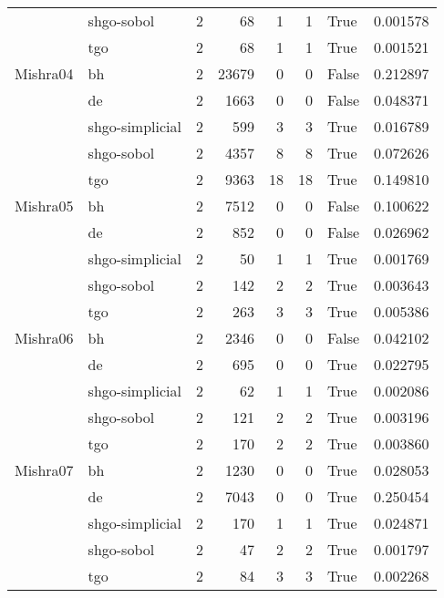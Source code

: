 \begin{longtable}{llrrrrlr}
         & shgo-sobol &     2 &       68 &      1 &       1 &    True &    0.001578 \\
         & tgo &     2 &       68 &      1 &       1 &    True &    0.001521 \\
Mishra04 & bh &     2 &    23679 &      0 &       0 &   False &    0.212897 \\
         & de &     2 &     1663 &      0 &       0 &   False &    0.048371 \\
         & shgo-simplicial &     2 &      599 &      3 &       3 &    True &    0.016789 \\
         & shgo-sobol &     2 &     4357 &      8 &       8 &    True &    0.072626 \\
         & tgo &     2 &     9363 &     18 &      18 &    True &    0.149810 \\
Mishra05 & bh &     2 &     7512 &      0 &       0 &   False &    0.100622 \\
         & de &     2 &      852 &      0 &       0 &   False &    0.026962 \\
         & shgo-simplicial &     2 &       50 &      1 &       1 &    True &    0.001769 \\
         & shgo-sobol &     2 &      142 &      2 &       2 &    True &    0.003643 \\
         & tgo &     2 &      263 &      3 &       3 &    True &    0.005386 \\
Mishra06 & bh &     2 &     2346 &      0 &       0 &   False &    0.042102 \\
         & de &     2 &      695 &      0 &       0 &    True &    0.022795 \\
         & shgo-simplicial &     2 &       62 &      1 &       1 &    True &    0.002086 \\
         & shgo-sobol &     2 &      121 &      2 &       2 &    True &    0.003196 \\
         & tgo &     2 &      170 &      2 &       2 &    True &    0.003860 \\
Mishra07 & bh &     2 &     1230 &      0 &       0 &    True &    0.028053 \\
         & de &     2 &     7043 &      0 &       0 &    True &    0.250454 \\
         & shgo-simplicial &     2 &      170 &      1 &       1 &    True &    0.024871 \\
         & shgo-sobol &     2 &       47 &      2 &       2 &    True &    0.001797 \\
         & tgo &     2 &       84 &      3 &       3 &    True &    0.002268 \\

\end{longtable}

